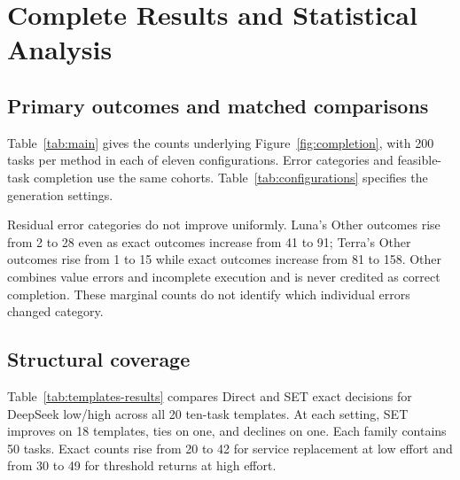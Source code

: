 \section{Complete Results and Statistical Analysis}
\label{app:statistics}
\subsection{Primary outcomes and matched comparisons}
Table~\ref{tab:main} gives the counts underlying Figure~\ref{fig:completion}, with 200 tasks per method in each of eleven configurations. Error categories and feasible-task completion use the same cohorts. Table~\ref{tab:configurations} specifies the generation settings.

Residual error categories do not improve uniformly. Luna's Other outcomes rise from 2 to 28 even as exact outcomes increase from 41 to 91; Terra's Other outcomes rise from 1 to 15 while exact outcomes increase from 81 to 158. Other combines value errors and incomplete execution and is never credited as correct completion. These marginal counts do not identify which individual errors changed category.

\begin{table}[!t]
\centering\small

\caption{\textbf{Primary comparison: Direct$\to$SET.} Here $n$ counts tasks per method. Exact requires decision and value correctness. Unsafe acceptance, false refusal (Refusal), and Other partition errors; Accept is exact completion among feasible cases.}
\label{tab:main}
\end{table}

\subsection{Structural coverage}
Table~\ref{tab:templates-results} compares Direct and SET exact decisions for DeepSeek low/high across all 20 ten-task templates. At each setting, SET improves on 18 templates, ties on one, and declines on one. Each family contains 50 tasks. Exact counts rise from 20 to 42 for service replacement at low effort and from 30 to 49 for threshold returns at high effort.

\begin{table}[!t]
\centering\small

\caption{Primary DeepSeek (DS) template coverage: Direct$\to$SET exact decisions, each out of ten. All 20 templates are included; family boundaries follow Table~\ref{tab:templates}.}
\label{tab:templates-results}
\end{table}

